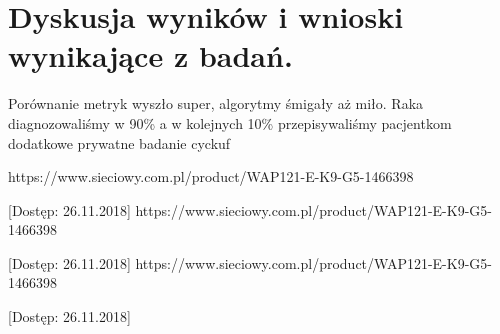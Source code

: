 \documentclass[12pt]{article}
\begin{document}

\section{Dyskusja wyników i wnioski wynikające z badań.}

Porównanie metryk wyszło super, algorytmy śmigały aż miło. Raka diagnozowaliśmy w 90\% a w kolejnych 10\% przepisywaliśmy pacjentkom dodatkowe prywatne badanie cyckuf



\newpage
\renewcommand\refname{Bibliografia}
\begin{thebibliography}{9}

  https://www.sieciowy.com.pl/product/WAP121-E-K9-G5-1466398

[Dostęp: 26.11.2018]
  https://www.sieciowy.com.pl/product/WAP121-E-K9-G5-1466398

[Dostęp: 26.11.2018]
  https://www.sieciowy.com.pl/product/WAP121-E-K9-G5-1466398

[Dostęp: 26.11.2018]

\end{thebibliography}
\end{document}
